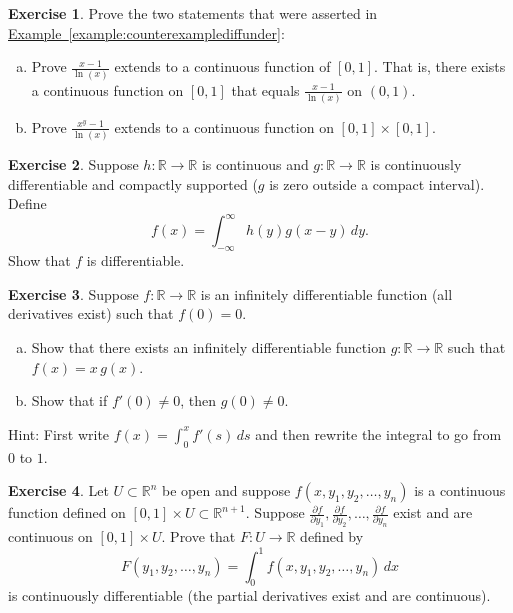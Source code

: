 \documentclass[12pt,openany]{book}
\newcommand{\R}{{\mathbb{R}}}
\theoremstyle{plain}
\theoremstyle{remark}
\theoremstyle{definition}
\newenvironment{exbox}{%
    \def\FrameCommand{\vrule width 1pt \relax\hspace{10pt}}%
    \MakeFramed{\advance\hsize-\width\FrameRestore}%
}{%
    \endMakeFramed
}
\newenvironment{exparts}{%
    \leavevmode\begin{enumerate}[a),noitemsep,topsep=0pt,parsep=0pt,partopsep=0pt]
}{%
    \end{enumerate}
}
\theoremstyle{exercise}
\newtheorem{exercise}{Exercise}[section]
\theoremstyle{example}
\newcommand{\exampleref}[1]{\hyperref[#1]{Example~\ref*{#1}}}
\begin{document}
\begin{exbox}
\begin{exercise} \label{exercise:counterexamplediffunder}
Prove the two statements that were asserted in
\exampleref{example:counterexamplediffunder}:
\begin{exparts}
\item
Prove $\frac{x-1}{\ln(x)}$ extends to a continuous function of
$[0,1]$.  That is, there exists a continuous function on $[0,1]$
that equals $\frac{x-1}{\ln(x)}$ on $(0,1)$.
\item
Prove $\frac{x^y-1}{\ln(x)}$ extends to a continuous function
on $[0,1] \times [0,1]$.
\end{exparts}
\end{exercise}

\begin{exercise}
Suppose $h \colon \R \to \R$ is continuous and $g
\colon \R \to \R$ is continuously differentiable and compactly
supported ($g$ is zero outside a compact interval).  Define
\begin{equation*}
f(x) = \int_{-\infty}^\infty h(y)g(x-y) \, dy  .
\end{equation*}
Show that $f$ is differentiable.
\end{exercise}

\begin{exercise}
Suppose $f \colon \R \to \R$ is an infinitely differentiable function (all derivatives exist)
such that $f(0) = 0$.
\begin{exparts}
\item
Show that there exists an infinitely
differentiable function $g \colon \R \to \R$ such that $f(x) = x\,g(x)$.
\item
Show that
if $f'(0) \not= 0$, then $g(0) \not= 0$.
\end{exparts}
Hint: First write
$f(x) = \int_0^x f'(s) \,ds$ and then rewrite the integral to go
from $0$ to $1$.
\end{exercise}

\begin{exercise}%
\label{exercise:severalvariableLiebniz}
Let $U \subset \R^n$ be open and suppose
$f(x,y_1,y_2,\ldots,y_n)$ is a continuous
function defined on $[0,1] \times U \subset \R^{n+1}$.
Suppose
$\frac{\partial f}{\partial y_1},
\frac{\partial f}{\partial y_2},\ldots,
\frac{\partial f}{\partial y_n}$
exist and are continuous on $[0,1] \times U$.
Prove that $F \colon U \to \R$ defined by
\begin{equation*}
F(y_1,y_2,\ldots,y_n) =
\int_0^1
f(x,y_1,y_2,\ldots,y_n)
\, dx
\end{equation*}
is continuously differentiable (the partial derivatives exist and are
continuous).
\end{exercise}


\end{exbox}
\end{document}
